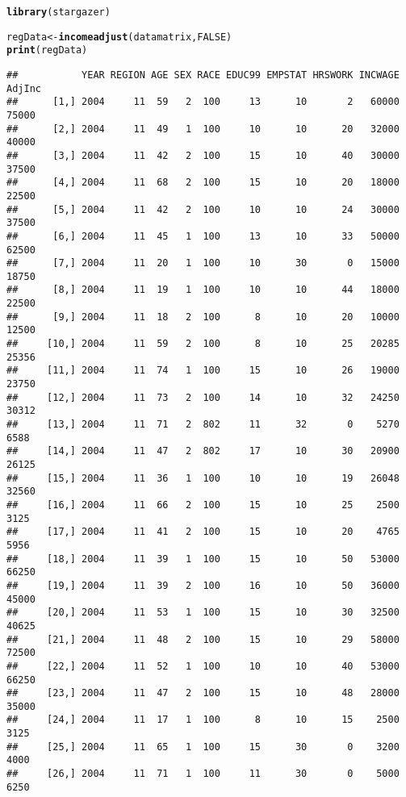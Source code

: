 \documentclass{article}\usepackage[]{graphicx}\usepackage[]{color}
\makeatletter
\newcommand{\hlnum}[1]{\textcolor[rgb]{0.686,0.059,0.569}{#1}}%
\newcommand{\hlstd}[1]{\textcolor[rgb]{0.345,0.345,0.345}{#1}}%
\newcommand{\hlkwb}[1]{\textcolor[rgb]{0.69,0.353,0.396}{#1}}%
\newcommand{\hlkwd}[1]{\textcolor[rgb]{0.737,0.353,0.396}{\textbf{#1}}}%
\newenvironment{kframe}{%
 \def\at@end@of@kframe{}%
 \ifinner\ifhmode%
  \def\at@end@of@kframe{\end{minipage}}%
  \begin{minipage}{\columnwidth}%
 \fi\fi%
 \def\FrameCommand##1{\hskip\@totalleftmargin \hskip-\fboxsep
 \colorbox{shadecolor}{##1}\hskip-\fboxsep
     \hskip-\linewidth \hskip-\@totalleftmargin \hskip\columnwidth}%
 \MakeFramed {\advance\hsize-\width
   \@totalleftmargin\z@ \linewidth\hsize
   \@setminipage}}%
 {\par\unskip\endMakeFramed%
 \at@end@of@kframe}
\newenvironment{knitrout}{}{} %
\makeatother
\begin{document}
\begin{knitrout}
\color{fgcolor}\begin{kframe}
\begin{alltt}
\hlkwd{library}\hlstd{(stargazer)}

\hlstd{regData} \hlkwb{<-} \hlkwd{incomeadjust}\hlstd{(datamatrix,} \hlnum{FALSE}\hlstd{)}
\hlkwd{print}\hlstd{(regData)}
\end{alltt}
\begin{verbatim}
##           YEAR REGION AGE SEX RACE EDUC99 EMPSTAT HRSWORK INCWAGE  AdjInc
##      [1,] 2004     11  59   2  100     13      10       2   60000   75000
##      [2,] 2004     11  49   1  100     10      10      20   32000   40000
##      [3,] 2004     11  42   2  100     15      10      40   30000   37500
##      [4,] 2004     11  68   2  100     15      10      20   18000   22500
##      [5,] 2004     11  42   2  100     10      10      24   30000   37500
##      [6,] 2004     11  45   1  100     13      10      33   50000   62500
##      [7,] 2004     11  20   1  100     10      30       0   15000   18750
##      [8,] 2004     11  19   1  100     10      10      44   18000   22500
##      [9,] 2004     11  18   2  100      8      10      20   10000   12500
##     [10,] 2004     11  59   2  100      8      10      25   20285   25356
##     [11,] 2004     11  74   1  100     15      10      26   19000   23750
##     [12,] 2004     11  73   2  100     14      10      32   24250   30312
##     [13,] 2004     11  71   2  802     11      32       0    5270    6588
##     [14,] 2004     11  47   2  802     17      10      30   20900   26125
##     [15,] 2004     11  36   1  100     10      10      19   26048   32560
##     [16,] 2004     11  66   2  100     15      10      25    2500    3125
##     [17,] 2004     11  41   2  100     15      10      20    4765    5956
##     [18,] 2004     11  39   1  100     15      10      50   53000   66250
##     [19,] 2004     11  39   2  100     16      10      50   36000   45000
##     [20,] 2004     11  53   1  100     15      10      30   32500   40625
##     [21,] 2004     11  48   2  100     15      10      29   58000   72500
##     [22,] 2004     11  52   1  100     10      10      40   53000   66250
##     [23,] 2004     11  47   2  100     15      10      48   28000   35000
##     [24,] 2004     11  17   1  100      8      10      15    2500    3125
##     [25,] 2004     11  65   1  100     15      30       0    3200    4000
##     [26,] 2004     11  71   1  100     11      30       0    5000    6250

\end{verbatim}
\end{kframe}
\end{knitrout}
\end{document}
